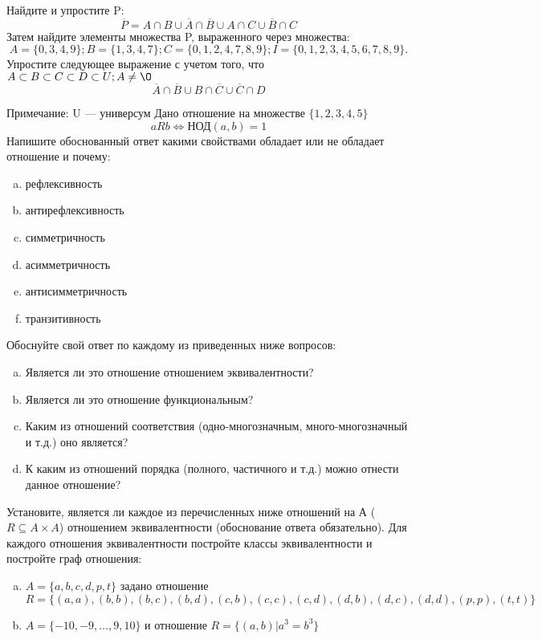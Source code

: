 \documentclass[10pt]{exam}
\begin{document}
\begin{questions}
\question
Найдите и упростите P:
\begin{equation*}
\overline{P} = A \cap B \cup \overline{A} \cap \overline{B} \cup A \cap C \cup \overline{B} \cap C
\end{equation*}
Затем найдите элементы множества P, выраженного через множества:
\begin{equation*}
A = \{0, 3, 4, 9\}; 
B = \{1, 3, 4, 7\};
C = \{0, 1, 2, 4, 7, 8, 9\};
I = \{0, 1, 2, 3, 4, 5, 6, 7, 8, 9\}.
\end{equation*}\question
Упростите следующее выражение с учетом того, что $A\subset B \subset C \subset D \subset U; A \neq \O$
\begin{equation*}
\overline{A} \cap \overline{B} \cup B \cap \overline{C} \cup \overline{C} \cap D
\end{equation*}

Примечание: U — универсум\question
Дано отношение на множестве $\{1, 2, 3, 4, 5\}$ 
\begin{equation*}
aRb \iff  \text{НОД}(a,b) =1
\end{equation*}
Напишите обоснованный ответ какими свойствами обладает или не обладает отношение и почему:   
\begin{enumerate} [a)]\setcounter{enumi}{0}
\item рефлексивность
\item антирефлексивность
\item симметричность
\item асимметричность
\item антисимметричность
\item транзитивность
\end{enumerate}

Обоснуйте свой ответ по каждому из приведенных ниже вопросов:
\begin{enumerate} [a)]\setcounter{enumi}{0}
    \item Является ли это отношение отношением эквивалентности?
    \item Является ли это отношение функциональным?
    \item Каким из отношений соответствия (одно-многозначным, много-многозначный и т.д.) оно является?
    \item К каким из отношений порядка (полного, частичного и т.д.) можно отнести данное отношение?
\end{enumerate}


\question
Установите, является ли каждое из перечисленных ниже отношений на А ($R \subseteq A \times A$) отношением эквивалентности (обоснование ответа обязательно). Для каждого отношения эквивалентности постройте классы 
эквивалентности и постройте граф отношения:
\begin{enumerate} [a)]\setcounter{enumi}{0}
\item $A = \{a, b, c, d, p, t\}$ задано отношение $R = \{(a, a), (b, b), (b, c), (b, d), (c, b), (c, c), (c, d), (d, b), (d, c), (d, d), (p,p), (t,t)\}$
\item $A = \{-10, -9, … , 9, 10\}$ и отношение $R = \{(a,b)|a^{3} = b^{3}\}$


\end{enumerate}
\end{questions}
\end{document}
